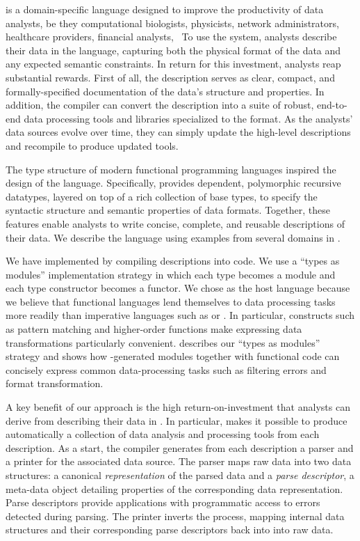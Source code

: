 \padsml{} is a domain-specific language designed to 
improve the productivity of data analysts, be they computational biologists, physicists, network administrators, healthcare providers, financial analysts, \etc\
To use the system, analysts describe their data in the \padsml{} language, capturing both the physical format of the data and any expected semantic constraints.  In return for this investment, analysts reap substantial rewards.
First of all, the description
serves as clear, compact, and formally-specified documentation of 
the data's structure and properties.  In addition, the \padsml{}
compiler can convert the description into a suite of robust, end-to-end
data processing tools and libraries specialized
to the format.  As the analysts' data sources evolve over time,
they can simply update the high-level descriptions
and recompile to produce updated tools.


The type structure of modern functional programming languages inspired the design of the \padsml{} language.  
Specifically, \padsml{} provides dependent, polymorphic recursive datatypes, layered on top of a rich collection of base types, to specify the syntactic structure and semantic properties of data
formats.  Together, these features enable analysts to write concise,
complete, and reusable descriptions of their data.  
We describe the \padsml{} language using examples from several domains
in \secref{sec:padsml-overview}.

We have implemented \padsml{} by compiling descriptions into
\ocaml{} code.  We use a
``types as modules'' implementation strategy in which each \padsml{} type
becomes a module and each \padsml{} type constructor becomes a functor. 
We chose \ml{} as the host language because we believe that 
functional languages lend themselves to data processing tasks more readily than imperative languages such as \C{} or \java{}.  In particular, constructs such as pattern matching and higher-order functions make expressing data transformations particularly convenient.  describes our ``types as modules''
strategy and shows how \padsml{}-generated modules together
with functional \ocaml{} code can concisely express
common
data-processing tasks such as filtering errors and format transformation.

A key benefit of our approach is the high return-on-investment that
analysts can derive from describing their data in \padsml{}.  In particular, \padsml{} makes it possible to produce automatically a collection of data analysis and processing tools from each description.   
As a start, the \padsml{} compiler generates from each description a parser and a printer for the associated data source.  The parser maps raw 
data into two data
structures: a canonical \textit{representation} of the parsed data and
a \textit{parse descriptor}, a meta-data object detailing properties
of the corresponding data representation.  Parse descriptors provide
applications with programmatic access to errors detected during
parsing.  The printer inverts the process, mapping internal data structures
and their corresponding parse descriptors back into into raw data.

